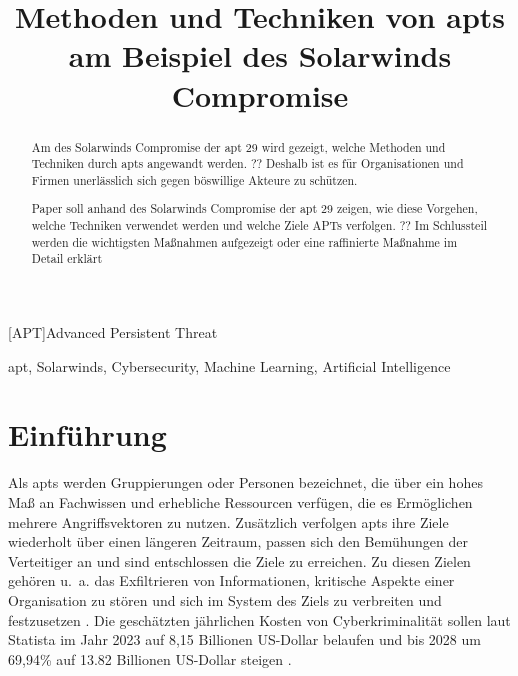 \documentclass[conference]{IEEEtran}
\begin{document}
\begin{acronym}
    [APT]{Advanced Persistent Threat}
\end{acronym}


\title{Methoden und Techniken von \aclp*{apt} am Beispiel des Solarwinds Compromise
}

\author{
}

\maketitle

\begin{abstract}

    Am des Solarwinds Compromise der \acs*{apt} 29 wird gezeigt, welche Methoden und Techniken durch \acsp*{apt} angewandt werden.
    ?? Deshalb ist es für Organisationen und Firmen unerlässlich sich gegen böswillige Akteure zu schützen.

    Paper soll anhand des Solarwinds Compromise der \ac{apt} 29 zeigen, wie diese Vorgehen, welche Techniken verwendet werden und welche Ziele APTs verfolgen.
    ?? Im Schlussteil werden die wichtigsten Maßnahmen aufgezeigt oder eine raffinierte Maßnahme im Detail erklärt
\end{abstract}

\begin{IEEEkeywords}
    \ac{apt}, Solarwinds, Cybersecurity, Machine Learning, Artificial Intelligence
\end{IEEEkeywords}

\section{Einführung}
Als \acp{apt} werden Gruppierungen oder Personen bezeichnet, die über ein hohes Maß an Fachwissen und erhebliche Ressourcen verfügen, die es Ermöglichen mehrere Angriffsvektoren zu nutzen.
Zusätzlich verfolgen \acp{apt} ihre Ziele wiederholt über einen längeren Zeitraum, passen sich den Bemühungen der Verteitiger an und sind entschlossen die Ziele zu erreichen.
Zu diesen Zielen gehören u.~a. das Exfiltrieren von Informationen, kritische Aspekte einer Organisation zu stören und sich im System des Ziels zu verbreiten und festzusetzen \cite[S.~B-1]{NIST2011}.
Die geschätzten jährlichen Kosten von Cyberkriminalität sollen laut Statista im Jahr 2023 auf 8,15 Billionen US-Dollar belaufen und bis 2028 um 69,94\% auf 13.82 Billionen US-Dollar steigen \cite{Statista2023}.
\end{document}
